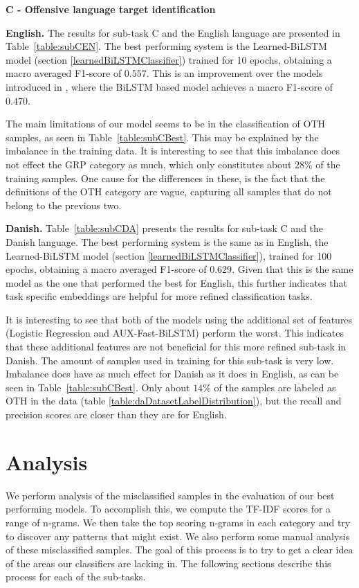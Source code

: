 \documentclass{article}
\begin{document}
\textbf{C - Offensive language target identification}\label{sec:resultsSubC}

\textbf{English.} The results for sub-task C and the English language are presented in Table~\ref{table:subCEN}. The best performing system is the Learned-BiLSTM model (section \ref{learnedBiLSTMClassifier}) trained for 10 epochs, obtaining a macro averaged F1-score of $0.557$. This is an improvement over the models introduced in \cite{zampieri2019predicting}, where the BiLSTM based model achieves a macro F1-score of $0.470$.

The main limitations of our model seems to be in the classification of OTH samples, as seen in Table~\ref{table:subCBest}. This may be explained by the imbalance in the training data. It is interesting to see that this imbalance does not effect the GRP category as much, which only constitutes about $28\%$ of the training samples. One cause for the differences in these, is the fact that the definitions of the OTH category are vague, capturing all samples that do not belong to the previous two. 

\textbf{Danish.} Table~\ref{table:subCDA} presents the results for sub-task C and the Danish language. The best performing system is the same as in English, the Learned-BiLSTM model (section \ref{learnedBiLSTMClassifier}), trained for 100 epochs, obtaining a macro averaged F1-score of $0.629$. Given that this is the same model as the one that performed the best for English, this further indicates that task specific embeddings are helpful for more refined classification tasks. 

It is interesting to see that both of the models using the additional set of features (Logistic Regression and AUX-Fast-BiLSTM) perform the worst. This indicates that these additional features are not beneficial for this more refined sub-task in Danish. The amount of samples used in training for this sub-task is very low. Imbalance does  have as much effect for Danish as it does in English, as can be seen in Table~\ref{table:subCBest}. Only about $14\%$ of the samples are labeled as OTH in the data (table \ref{table:daDatasetLabelDistribution}), but  the recall and precision scores are  closer than they are for English.


\section{Analysis}\label{sec:errorAnalysis}
We perform analysis of the misclassified samples in the evaluation of our best performing models. To accomplish this, we compute the TF-IDF scores for a range of n-grams. We then take the top scoring n-grams in each category and try to discover any patterns that might exist. We also perform some manual analysis of these misclassified samples. The goal of this process is to try to get a clear idea of the areas our classifiers are lacking in. The following sections describe this process for each of the sub-tasks. 
\end{document}
